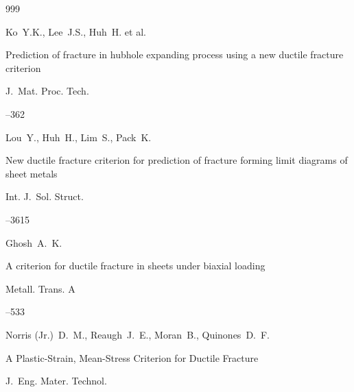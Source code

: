 \begin{thebibliography}{999}




\by Ko~Y.K., Lee~J.S., Huh~H. et al.

\paper Prediction of fracture in hubhole expanding process using a new ductile fracture criterion

\jour J.~Mat. Proc. Tech.



–362






\by Lou~Y., Huh~H., Lim~S., Pack~K. 

\paper New ductile fracture criterion for prediction of fracture forming limit diagrams of sheet metals

\jour Int. J.~Sol. Struct.  




–3615










\by Ghosh~A.~K. 

\paper A criterion for ductile fracture in sheets under biaxial loading

\jour Metall. Trans. A




–533






\by  Norris (Jr.)~D.~M., Reaugh~J.~E., Moran~B., Quinones~D.~F.

\paper A Plastic-Strain, Mean-Stress Criterion for Ductile Fracture

\jour J.~Eng. Mater. Technol.


\end{thebibliography}
